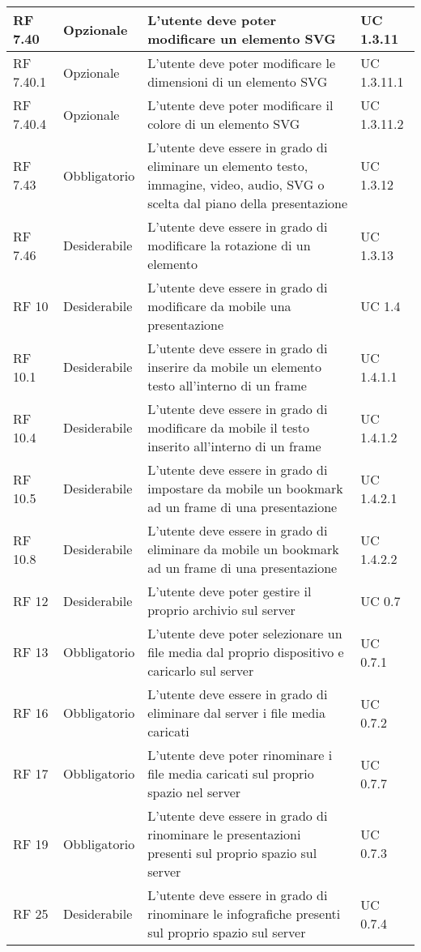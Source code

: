 {\begin{longtable} [c]{| p{2.5cm} | p{2.5cm} | p{6cm} |p{2.5cm}|}
 \hline 
RF 7.40 & Opzionale & L'utente deve poter modificare un elemento SVG & UC 1.3.11\\ 
 \hline 
RF 7.40.1 & Opzionale & L'utente deve poter modificare le dimensioni di un elemento SVG & UC 1.3.11.1\\ 
 \hline 
RF 7.40.4 & Opzionale & L'utente deve poter modificare il colore di un elemento SVG & UC 1.3.11.2\\ 
 \hline 
RF 7.43 & Obbligatorio & L'utente deve essere in grado di eliminare un elemento testo, immagine, video, audio, SVG o scelta dal piano della presentazione & UC 1.3.12\\ 
 \hline 
RF 7.46 & Desiderabile & L'utente deve essere in grado di modificare la rotazione di un elemento & UC 1.3.13\\ 
 \hline 
RF 10 & Desiderabile & L’utente deve essere in grado di modificare da mobile una presentazione & UC 1.4\\ 
 \hline 
RF 10.1 & Desiderabile & L'utente deve essere in grado di inserire da mobile un elemento testo all'interno di un frame & UC 1.4.1.1\\ 
 \hline 
RF 10.4 & Desiderabile & L'utente deve essere in grado di modificare da mobile il testo inserito all'interno di un frame & UC 1.4.1.2\\ 
 \hline 
RF 10.5 & Desiderabile & L'utente deve essere in grado di impostare da mobile un bookmark ad un frame di una presentazione & UC 1.4.2.1\\ 
 \hline 
RF 10.8 & Desiderabile & L'utente deve essere in grado di eliminare da mobile un bookmark ad un frame di una presentazione & UC 1.4.2.2\\ 
 \hline 
RF 12 & Desiderabile & L'utente deve poter gestire il proprio archivio sul server & UC 0.7\\ 
 \hline 
RF 13 & Obbligatorio & L’utente deve poter selezionare un file media dal proprio dispositivo e caricarlo sul server & UC 0.7.1\\ 
 \hline 
RF 16 & Obbligatorio & L’utente deve essere in grado di eliminare dal server i file media caricati & UC 0.7.2\\ 
 \hline 
RF 17 & Obbligatorio & L'utente deve poter rinominare i file media caricati sul proprio spazio nel server & UC 0.7.7\\ 
 \hline 
RF 19 & Obbligatorio & L'utente deve essere in grado di rinominare le presentazioni presenti sul proprio spazio sul server & UC 0.7.3\\ 
 \hline 
RF 25 & Desiderabile & L'utente deve essere in grado di rinominare le infografiche presenti sul proprio spazio sul server & UC 0.7.4\\ 

\end{longtable}}
